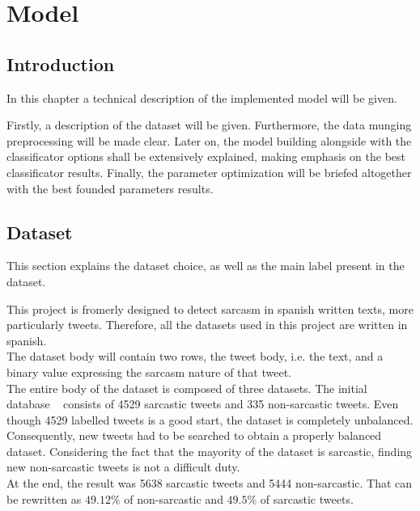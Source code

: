 \chapter{Model}
\label{chap:model}

\section{Introduction}
\label{sec:introduction}
In this chapter a technical description of the implemented model will be given.\par 
Firstly, a description of the dataset will be given. Furthermore, the data munging preprocessing will be made clear. Later on, the model building alongside with the classificator options shall be extensively explained, making emphasis on the best classificator results. Finally, the parameter optimization will be briefed altogether with the best founded parameters results.
\section{Dataset}
\label{sec:use-cases}
This section explains the dataset choice, as well as the main label present in the dataset.\par
This project is fromerly designed to detect sarcasm in spanish written texts, more particularly tweets. Therefore, all the datasets used in this project are written in spanish.\\
The dataset body will contain two rows, the tweet body, i.e. the text, and a binary value expressing the sarcasm nature of that tweet.\\
The entire body of the dataset is composed of three datasets. The initial database ~\cite{mexic} consists of 4529 sarcastic tweets and 335 non-sarcastic tweets. Even though 4529 labelled tweets is a good start, the dataset is completely unbalanced. Consequently, new tweets had to be searched to obtain a properly balanced dataset. Considering the fact that the mayority of the dataset is sarcastic, finding new non-sarcastic tweets is not a difficult duty.\\
At the end, the result was 5638 sarcastic tweets and 5444 non-sarcastic. That can be rewritten as $49.12\%$ of non-sarcastic and $49.5\%$ of sarcastic tweets.\par

